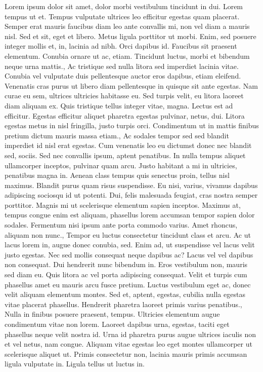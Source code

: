\documentclass{source/tex/templates/maththesis}
\begin{document}
Lorem ipsum dolor sit amet, dolor morbi vestibulum tincidunt in dui. Lorem tempus ut et. Tempus vulputate ultrices leo efficitur egestas quam placerat. Semper erat mauris faucibus diam leo ante convallis mi, non vel diam a mauris nisl. Sed et sit, eget et libero. Metus ligula porttitor ut morbi. Enim, sed posuere integer mollis et, in, lacinia ad nibh. Orci dapibus id. Faucibus sit praesent elementum. Conubia ornare ut ac, etiam. Tincidunt luctus, morbi et bibendum neque urna mattis., Ac tristique sed nulla litora sed imperdiet lacinia vitae. Conubia vel vulputate duis pellentesque auctor eros dapibus, etiam eleifend. Venenatis cras purus ut libero diam pellentesque in quisque sit ante egestas. Nam curae eu sem, ultrices ultricies habitasse eu. Sed turpis velit, eu litora laoreet diam aliquam ex. Quis tristique tellus integer vitae, magna. Lectus est ad efficitur. Egestas efficitur aliquet pharetra egestas pulvinar, netus, dui. Litora egestas metus in nisl fringilla, justo turpis orci. Condimentum ut in mattis finibus pretium dictum mauris massa etiam., Ac sodales tempor sed sed blandit imperdiet id nisl erat egestas. Cum venenatis leo eu dictumst donec nec blandit sed, sociis. Sed nec convallis ipsum, aptent penatibus. In nulla tempus aliquet ullamcorper inceptos, pulvinar quam arcu. Justo habitant a mi in ultricies, penatibus magna in. Aenean class tempus quis senectus proin, tellus nisl maximus. Blandit purus quam risus suspendisse. Eu nisi, varius, vivamus dapibus adipiscing sociosqu id ut potenti. Dui, felis malesuada feugiat, cras nostra semper porttitor. Magnis mi ut scelerisque elementum sapien inceptos. Maximus at, tempus congue enim est aliquam, phasellus lorem accumsan tempor sapien dolor sodales. Fermentum nisi ipsum ante porta commodo varius. Amet rhoncus, aliquam non nunc., Tempor eu luctus consectetur tincidunt class et arcu. Ac ut lacus lorem in, augue donec conubia, sed. Enim ad, ut suspendisse vel lacus velit justo egestas. Nec sed mollis consequat neque dapibus ac? Lacus vel vel dapibus non consequat. Dui hendrerit nunc bibendum in. Eros vestibulum non, mauris sed diam eu. Quis litora ac vel porta adipiscing consequat. Velit et turpis cum phasellus amet eu mauris arcu fusce pretium. Luctus vestibulum eget ac, donec velit aliquam elementum montes. Sed et, aptent, egestas, cubilia nulla egestas vitae placerat phasellus. Hendrerit pharetra laoreet primis varius penatibus., Nulla in finibus posuere praesent, tempus. Ultricies elementum augue condimentum vitae non lorem. Laoreet dapibus urna, egestas, taciti eget phasellus neque velit nostra id. Urna id pharetra purus augue ultrices iaculis non et vel netus, nam congue. Aliquam vitae egestas leo eget montes ullamcorper ut scelerisque aliquet ut. Primis consectetur non, lacinia mauris primis accumsan ligula vulputate in. Ligula tellus ut luctus in.
\end{document}
